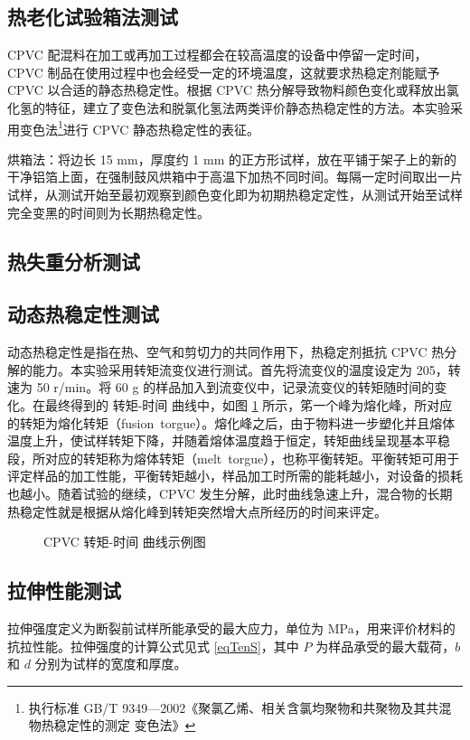 \subsection{热老化试验箱法测试}
CPVC 配混料在加工或再加工过程都会在较高温度的设备中停留一定时间，CPVC 制品在使用过程中也会经受一定的环境温度，这就要求热稳定剂能赋予 CPVC 以合适的静态热稳定性。根据 CPVC 热分解导致物料颜色变化或释放出氯化氢的特征，建立了变色法和脱氯化氢法两类评价静态热稳定性的方法。本实验采用变色法\footnote{执行标准 GB/T 9349—2002《聚氯乙烯、相关含氯均聚物和共聚物及其共混物热稳定性的测定 变色法》}进行 CPVC 静态热稳定性的表征。\par
烘箱法：将边长 15 mm，厚度约 1 mm 的正方形试样，放在平铺于架子上的新的干净铝箔上面，在强制鼓风烘箱中于高温下加热不同时间。每隔一定时间取出一片试样，从测试开始至最初观察到颜色变化即为初期热稳定定性，从测试开始至试样完全变黑的时间则为长期热稳定性。

\subsection{热失重分析测试}

\subsection{动态热稳定性测试}\label{sectionHakee}
动态热稳定性是指在热、空气和剪切力的共同作用下，热稳定剂抵抗 CPVC 热分解的能力。本实验采用转矩流变仪进行测试。首先将流变仪的温度设定为 205\cd，转速为 50 r/min。将 60 g 的样品加入到流变仪中，记录流变仪的转矩随时间的变化。在最终得到的 转矩-时间 曲线中，如图 \ref{figExHakee} 所示，笫一个峰为熔化峰，所对应的转矩为熔化转矩（fusion torgue）。熔化峰之后，由于物料进一步塑化并且熔体温度上升，使试样转矩下降，并随着熔体温度趋于恒定，转矩曲线呈现基本平稳段，所对应的转矩称为熔体转矩（melt torgue），也称平衡转矩。平衡转矩可用于评定样品的加工性能，平衡转矩越小，样品加工时所需的能耗越小，对设备的损耗也越小。随着试验的继续，CPVC 发生分解，此时曲线急速上升，混合物的长期热稳定性就是根据从熔化峰到转矩突然增大点所经历的时间来评定。

\begin{figure}[!htb]
    \begin{center}
        
    \end{center}
    \caption{CPVC 转矩-时间 曲线示例图}
    \label{figExHakee}
\end{figure}

\subsection{拉伸性能测试}
拉伸强度定义为断裂前试样所能承受的最大应力，单位为 MPa，用来评价材料的抗拉性能。拉伸强度的计算公式见式 \eqref{eqTenS}，其中 $P$ 为样品承受的最大载荷，$b$ 和 $d$ 分别为试样的宽度和厚度。

